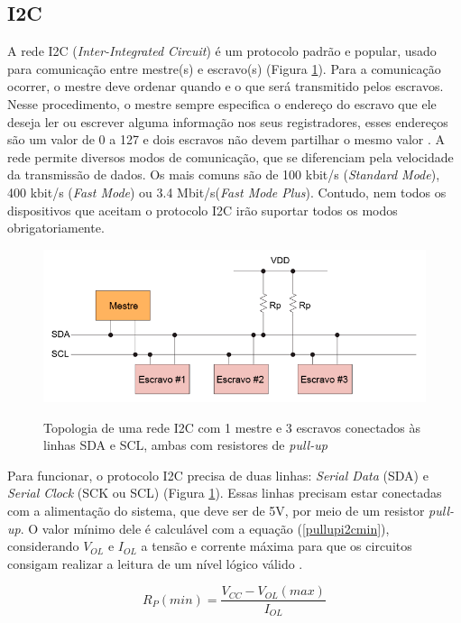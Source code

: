 \subsection{I2C}

A rede I2C (\textit{Inter-Integrated Circuit}) é um protocolo padrão e popular, usado para comunicação entre mestre(s) e escravo(s) (Figura \ref{fig:i2connection}). 
Para a comunicação ocorrer, o mestre deve ordenar quando e o que será transmitido pelos escravos. Nesse procedimento, o mestre sempre especifica o endereço do escravo que ele deseja ler ou escrever alguma informação nos seus registradores, esses endereços são um valor de 0 a 127 e dois escravos não devem partilhar o mesmo valor \cite{man:texasI2C}. A rede permite diversos modos de comunicação, que se diferenciam pela velocidade da transmissão de dados. Os mais comuns são de 100 kbit/s (\textit{Standard Mode}), 400 kbit/s (\textit{Fast Mode}) ou 3.4 Mbit/s(\textit{Fast Mode Plus}). Contudo, nem todos os dispositivos que aceitam o protocolo I2C irão suportar todos os modos obrigatoriamente.

\begin{figure}[!htb]
	\centering
	\caption{Topologia de uma rede I2C com 1 mestre e 3 escravos conectados às linhas SDA e SCL, ambas com resistores de \textit{pull-up}}
	\includegraphics[width=0.7\linewidth]{figuras/revisaobiblio/i2connection}
	\label{fig:i2connection}
\end{figure}

Para funcionar, o protocolo I2C precisa de duas linhas: \textit{Serial Data} (SDA) e \textit{Serial Clock} (SCK ou SCL) (Figura \ref{fig:i2connection}). Essas linhas precisam estar conectadas com a alimentação do sistema, que deve ser de 5V, por meio de um resistor \textit{pull-up}. O valor mínimo dele é calculável com a equação (\ref{pullupi2cmin}), considerando $ V_{OL} $ e $ I_{OL} $ a tensão e corrente máxima para que os circuitos consigam realizar a leitura de um nível lógico válido \cite{man:texasI2Cpullup}. 

\begin{equation}
	R_P(min) = \dfrac{ V_{CC} - V_{OL}(max) }{I_{OL}}
	\label{pullupi2cmin}
\end{equation}

